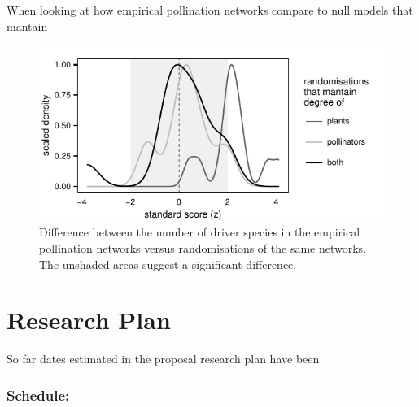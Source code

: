\documentclass[a4paper]{article}
\begin{document}
When looking at how empirical pollination networks compare to null models that mantain 

\begin{figure}
    \centering
		\includegraphics{random_degree}
    \caption{
    Difference between the number of driver species in the empirical pollination networks versus randomisations of the same networks. The unshaded areas suggest a significant difference.
    }
    \label{fig:random_degree}
\end{figure} 


\section*{Research Plan}

So far dates estimated in the proposal research plan have been  

\subsubsection*{Schedule:}
 
\printbibliography
\end{document}
